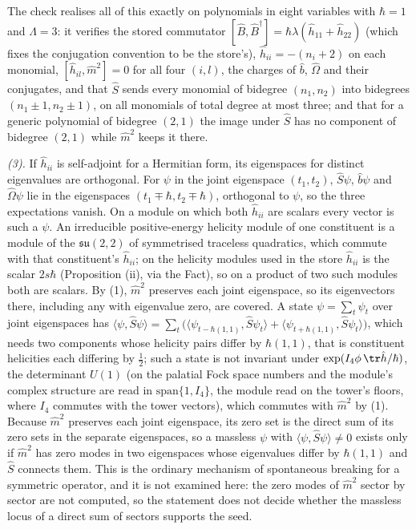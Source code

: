 The check realises all of this exactly on polynomials in eight variables with $\hbar = 1$ and $\Lambda = 3$: it verifies the stored commutator $[\hat{B}, \hat{B}^{\dagger}] = \hbar\lambda(\hat{h}_{11} + \hat{h}_{22})$ (which fixes the conjugation convention to be the store's), $\hat{h}_{ii} = -(n_{i} + 2)$ on each monomial, $[\hat{h}_{il}, \hat{m}^{2}] = 0$ for all four $(i, l)$, the charges of $\hat{b}$, $\hat{\Omega}$ and their conjugates, and that $\hat{S}$ sends every monomial of bidegree $(n_{1}, n_{2})$ into bidegrees $(n_{1} \pm 1, n_{2} \pm 1)$, on all monomials of total degree at most three; and that for a generic polynomial of bidegree $(2, 1)$ the image under $\hat{S}$ has no component of bidegree $(2, 1)$ while $\hat{m}^{2}$ keeps it there.

\emph{(3).} If $\hat{h}_{ii}$ is self-adjoint for a Hermitian form, its eigenspaces for distinct eigenvalues are orthogonal. For $\psi$ in the joint eigenspace $(t_{1}, t_{2})$, $\hat{S}\psi$, $\hat{b}\psi$ and $\hat{\Omega}\psi$ lie in the eigenspaces $(t_{1} \mp \hbar, t_{2} \mp \hbar)$, orthogonal to $\psi$, so the three expectations vanish. On a module on which both $\hat{h}_{ii}$ are scalars every vector is such a $\psi$. An irreducible positive-energy helicity module of one constituent is a module of the $\mathfrak{su}(2,2)$ of symmetrised traceless quadratics, which commute with that constituent's $\hat{h}_{ii}$; on the helicity modules used in the store $\hat{h}_{ii}$ is the scalar $2s\hbar$ (Proposition (ii), via the Fact), so on a product of two such modules both are scalars. By (1), $\hat{m}^{2}$ preserves each joint eigenspace, so its eigenvectors there, including any with eigenvalue zero, are covered. A state $\psi = \sum_{t}\psi_{t}$ over joint eigenspaces has $\langle\psi, \hat{S}\psi\rangle = \sum_{t}\bigl(\langle\psi_{t - \hbar(1,1)}, \hat{S}\psi_{t}\rangle + \langle\psi_{t + \hbar(1,1)}, \hat{S}\psi_{t}\rangle\bigr)$, which needs two components whose helicity pairs differ by $\hbar(1,1)$, that is constituent helicities each differing by $\tfrac12$; such a state is not invariant under $\exp(I_{4}\phi\,\tr\hat{h}/\hbar)$, the determinant $U(1)$ (on the palatial Fock space numbers and the module's complex structure are read in $\mathrm{span}\{1, I_{4}\}$, the module read on the tower's floors, where $I_{4}$ commutes with the tower vectors), which commutes with $\hat{m}^{2}$ by (1). Because $\hat{m}^{2}$ preserves each joint eigenspace, its zero set is the direct sum of its zero sets in the separate eigenspaces, so a massless $\psi$ with $\langle\psi, \hat{S}\psi\rangle \ne 0$ exists only if $\hat{m}^{2}$ has zero modes in two eigenspaces whose eigenvalues differ by $\hbar(1,1)$ and $\hat{S}$ connects them. This is the ordinary mechanism of spontaneous breaking for a symmetric operator, and it is not examined here: the zero modes of $\hat{m}^{2}$ sector by sector are not computed, so the statement does not decide whether the massless locus of a direct sum of sectors supports the seed.

